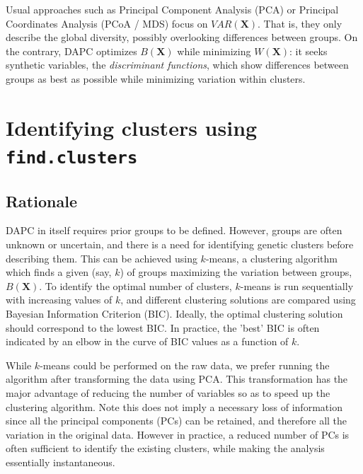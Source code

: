 \documentclass{article}
\newcommand{\m}[1]{\mathbf{#1}}
\newcommand{\code}[1]{{{\tt #1}}}
\begin{document}
Usual approaches such as Principal Component Analysis (PCA) or Principal Coordinates
Analysis (PCoA / MDS) focus on $VAR(\m{X})$. That is, they only describe the global diversity,
possibly overlooking differences between groups. On the contrary, DAPC optimizes $B(\m{X})$ while
minimizing $W(\m{X})$: it seeks synthetic variables, the \textit{discriminant functions}, which show
differences between groups as best as possible while minimizing variation within clusters.










\section{Identifying clusters using \code{find.clusters}}

\subsection{Rationale}
DAPC in itself requires prior groups to be defined. However, groups are often unknown or uncertain,
and there is a need for identifying genetic clusters before describing them. This can be achieved
using $k$-means, a clustering algorithm which finds a given (say, $k$) of groups maximizing the variation between
groups, $B(\m{X})$. To identify the optimal number of clusters, $k$-means is run sequentially with
increasing values of $k$, and different clustering solutions are compared using Bayesian Information
Criterion (BIC). Ideally, the optimal clustering solution should correspond to the lowest BIC. In
practice, the 'best' BIC is often indicated by an elbow in the curve of BIC values as a function of
$k$.

While $k$-means could be performed on the raw data, we prefer running the algorithm after
transforming the data using PCA. This transformation has the major advantage of reducing the
number of variables so as to speed up the clustering algorithm. Note this does not imply a necessary
loss of information since all the principal components (PCs) can be retained, and therefore all the variation in the original data.
However in practice, a reduced number of PCs is often sufficient to identify the existing clusters,
while making the analysis essentially instantaneous.


\end{document}
